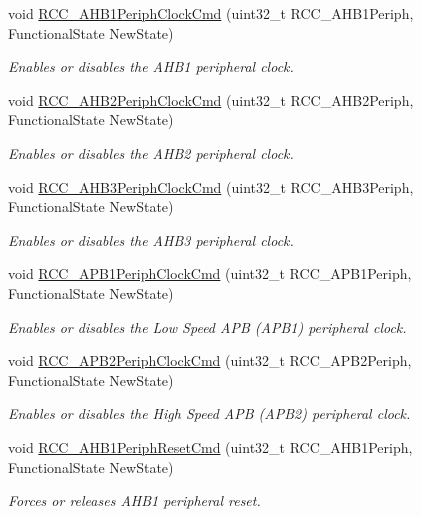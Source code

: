 \begin{DoxyCompactItemize}
void \hyperlink{group___r_c_c_ga80c89116820d48bb38db2e7d5e5a49b9}{R\-C\-C\-\_\-\-A\-H\-B1\-Periph\-Clock\-Cmd} (uint32\-\_\-t R\-C\-C\-\_\-\-A\-H\-B1\-Periph, Functional\-State New\-State)
\begin{DoxyCompactList}\small\item\em Enables or disables the A\-H\-B1 peripheral clock. \end{DoxyCompactList}\item 
void \hyperlink{group___r_c_c_gaadffedbd87e796f01d9776b8ee01ff5e}{R\-C\-C\-\_\-\-A\-H\-B2\-Periph\-Clock\-Cmd} (uint32\-\_\-t R\-C\-C\-\_\-\-A\-H\-B2\-Periph, Functional\-State New\-State)
\begin{DoxyCompactList}\small\item\em Enables or disables the A\-H\-B2 peripheral clock. \end{DoxyCompactList}\item 
void \hyperlink{group___r_c_c_ga4eb8c119f2e9bf2bd2e042d27f151338}{R\-C\-C\-\_\-\-A\-H\-B3\-Periph\-Clock\-Cmd} (uint32\-\_\-t R\-C\-C\-\_\-\-A\-H\-B3\-Periph, Functional\-State New\-State)
\begin{DoxyCompactList}\small\item\em Enables or disables the A\-H\-B3 peripheral clock. \end{DoxyCompactList}\item 
void \hyperlink{group___r_c_c_gaee7cc5d73af7fe1986fceff8afd3973e}{R\-C\-C\-\_\-\-A\-P\-B1\-Periph\-Clock\-Cmd} (uint32\-\_\-t R\-C\-C\-\_\-\-A\-P\-B1\-Periph, Functional\-State New\-State)
\begin{DoxyCompactList}\small\item\em Enables or disables the Low Speed A\-P\-B (A\-P\-B1) peripheral clock. \end{DoxyCompactList}\item 
void \hyperlink{group___r_c_c_ga56ff55caf8d835351916b40dd030bc87}{R\-C\-C\-\_\-\-A\-P\-B2\-Periph\-Clock\-Cmd} (uint32\-\_\-t R\-C\-C\-\_\-\-A\-P\-B2\-Periph, Functional\-State New\-State)
\begin{DoxyCompactList}\small\item\em Enables or disables the High Speed A\-P\-B (A\-P\-B2) peripheral clock. \end{DoxyCompactList}\item 
void \hyperlink{group___r_c_c_gaa7c450567f4731d4f0615f63586cad86}{R\-C\-C\-\_\-\-A\-H\-B1\-Periph\-Reset\-Cmd} (uint32\-\_\-t R\-C\-C\-\_\-\-A\-H\-B1\-Periph, Functional\-State New\-State)
\begin{DoxyCompactList}\small\item\em Forces or releases A\-H\-B1 peripheral reset. \end{DoxyCompactList}\item 

\end{DoxyCompactItemize}
